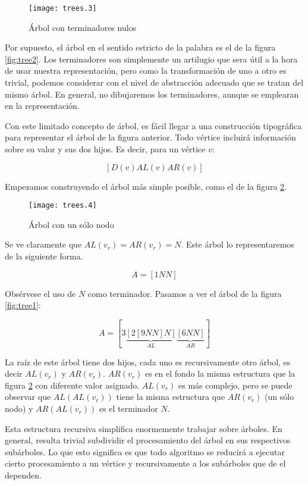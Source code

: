 \documentclass[10pt,spanish,twocolumn]{article}
\begin{document}
\begin{figure}[h]
    \centering
    \texttt{[image: trees.3]}
    \caption{Árbol con terminadores nulos}
    \label{fig:tree3}
\end{figure}

Por supuesto, el árbol en el sentido estricto de la palabra es el de la figura 
\ref{fig:tree2}.  Los terminadores son simplemente un artilugio que sera útil a 
la hora de usar nuestra representación, pero como la transformación de uno a 
otro es trivial, podemos considerar con el nivel de abstracción adecuado que se 
tratan del mismo árbol.  En general, no dibujaremos los terminadores, aunque se 
emplearan en la representación.

Con este limitado concepto de árbol, es fácil llegar a una construcción 
tipográfica para representar el árbol de la figura anterior.  Todo vértice 
incluirá información sobre su valor y sus dos hijos.  Es decir, para un vértice 
$v$: 

$$
    [D(v) AL(v) AR(v)]
$$

Empezamos construyendo el árbol más simple posible, como el de la figura 
\ref{fig:tree4}.

\begin{figure}[h]
    \centering
    \texttt{[image: trees.4]}
    \caption{Árbol con un sólo nodo}
    \label{fig:tree4}
\end{figure}

Se ve claramente que $AL(v_r) = AR(v_r) = N$.  Este árbol lo representaremos de 
la siguiente forma.

$$
    A = [1 N N]
$$

Obsérvese el uso de $N$ como terminador.  Pasamos a ver el árbol de la figura 
\ref{fig:tree1}:

$$
    A = [3 \underbrace{[2 [9 N N] N]}_{AL} \underbrace{[6 N N]}_{AR}]
$$

La raíz de este árbol tiene dos hijos, cada uno es recursivamente otro árbol, 
es decir $AL(v_r)$ y $AR(v_r)$.  $AR(v_r)$ es en el fondo la misma estructura 
que la figura \ref{fig:tree4} con diferente valor asignado.  $AL(v_r)$ es más 
complejo, pero se puede observar que $AL(AL(v_r))$ tiene la misma estructura 
que $AR(v_r)$ (un sólo nodo) y $AR(AL(v_r))$ es el terminador $N$.

Esta estructura recursiva simplifica enormemente trabajar sobre árboles.  En 
general, resulta trivial subdividir el procesamiento del árbol en sus 
respectivos subárboles.  Lo que esto significa es que todo algoritmo se 
reducirá a ejecutar cierto procesamiento a un vértice y recursivamente a los 
subárboles que de el dependen.
\end{document}
